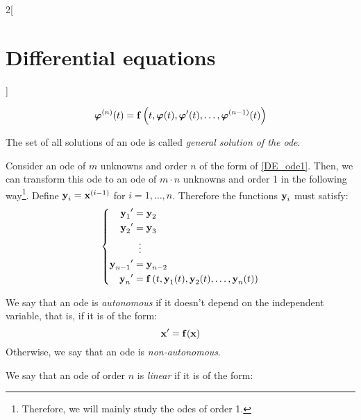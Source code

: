 \documentclass[../../../main.tex]{subfiles}
\begin{document}
\begin{multicols}{2}[\section{Differential equations}]
\begin{definition}
\begin{itemize}
            $$\boldsymbol{\mathrm{\varphi}}^{(n)}(t)=\boldsymbol{\mathrm{f}}\left(t,\boldsymbol{\mathrm{\varphi}}(t),\boldsymbol{\mathrm{\varphi}}'(t),\ldots,\boldsymbol{\mathrm{\varphi}}^{(n-1)}(t)\right)$$
    \end{itemize}
    The set of all solutions of an ode is called \textit{general solution of the ode}.
  \end{definition}
  \begin{prop}
    Consider an ode of $m$ unknowns and order $n$ of the form of \eqref{DE_ode1}. Then, we can transform this ode to an ode of $m\cdot n$ unknowns and order 1 in the following way\footnote{Therefore, we will mainly study the odes of order 1.}. Define $\boldsymbol{\mathrm{y}}_i=\boldsymbol{\mathrm{x}}^{(i-1)}$ for $i=1,\ldots,n$. Therefore the functions $\boldsymbol{\mathrm{y}}_i$ must satisfy:
    \begin{equation*}
      \left\{
      \begin{aligned}
        {\boldsymbol{\mathrm{y}}_1}'     & =\boldsymbol{\mathrm{y}}_2                                                                                            \\
        {\boldsymbol{\mathrm{y}}_2}'     & =\boldsymbol{\mathrm{y}}_3                                                                                            \\
                                    & \;\;\vdots                                                                                                       \\
        {\boldsymbol{\mathrm{y}}_{n-1}}' & =\boldsymbol{\mathrm{y}}_{n-2}                                                                                        \\
        {\boldsymbol{\mathrm{y}}_n}'     & =\boldsymbol{\mathrm{f}}\left(t,\boldsymbol{\mathrm{y}}_1(t),\boldsymbol{\mathrm{y}}_2(t),\ldots,\boldsymbol{\mathrm{y}}_n(t)\right) \\
      \end{aligned}
      \right.
    \end{equation*}
  \end{prop}
  \begin{definition}
    We say that an ode is \textit{autonomous} if it doesn't depend on the independent variable, that is, if it is of the form: $$\boldsymbol{\mathrm{x}}'=\boldsymbol{\mathrm{f}}(\boldsymbol{\mathrm{x}})$$ Otherwise, we say that an ode is \textit{non-autonomous}.
  \end{definition}
  \begin{definition}
    We say that an ode of order $n$ is \textit{linear} if it is of the form:

\end{definition}
\end{multicols}
\end{document}
